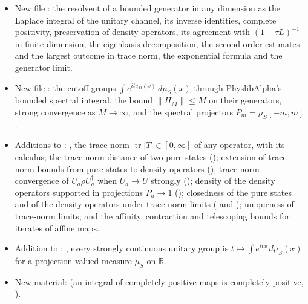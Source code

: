 \documentclass[11pt]{article}
\begin{document}
\begin{itemize}
\item New file : the resolvent
  of a bounded generator in any dimension as the Laplace integral of the unitary channel, its
  inverse identities, complete positivity, preservation of density operators, its agreement with
  $(1 - \tau L)^{-1}$ in finite dimension, the eigenbasis decomposition, the
  second-order estimates and the largest outcome in trace norm, the exponential formula and the
  generator limit.
\item New file : the cutoff groups
  $\int e^{itc_M(x)}\,d\mu_S(x)$ through PhyslibAlpha's bounded spectral integral, the bound
  $\|H_M\| \le M$ on their generators, strong convergence as $M \to \infty$, and the spectral
  projectors $P_m = \mu_S[-m,m]$.
\item Additions to : , the trace
  norm $\operatorname{tr}|T| \in [0,\infty]$ of any operator, with its calculus; the trace-norm
  distance of two pure states (); extension of trace-norm bounds
  from pure states to density operators (); trace-norm
  convergence of $U_a\rho U_a^\dagger$ when $U_a \to U$ strongly ();
  density of the density operators supported in projections $P_a \to 1$
  (); closedness of the pure states and of the density
  operators under trace-norm limits ( and
  ); uniqueness of trace-norm limits; and the
  affinity, contraction and telescoping bounds for iterates of affine maps.
\item Addition to :\newline
  , every strongly continuous unitary
  group is $t \mapsto \int e^{itx}\,d\mu_S(x)$ for a projection-valued measure $\mu_S$ on
  $\mathbb{R}$.
\item New  material:\newline
   (an integral of completely
  positive maps is completely positive, ).
\end{itemize}
\end{document}
